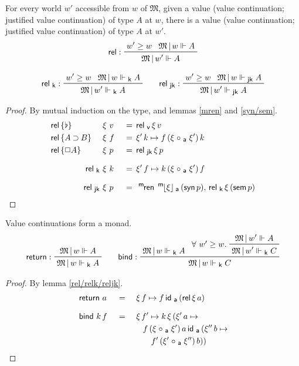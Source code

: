 \documentclass{entcs}
\numberwithin{equation}{thm}
\newcommand{\tsf}[1]{\textsf{\upshape{#1}}}
\newcommand{\stsf}[1]{\smash{\tsf{\small{#1}}}}
\renewcommand{\:}{\mathrel{:}}
\newcommand{\tyrule}[1]{\prftree[l]{${#1} \:\,$}}
\let\oldforall\forall
\renewcommand{\forall}{\oldforall\,}
\newcommand{\0}{\varnothing}
\newcommand{\base}{\flat}
\newcommand{\imp}{\mathbin{\supset}}
\newcommand{\sq}{\Box}
\newcommand{\mren}{\operatorname{^{\stsf{m}\mkern-2mu}\tsf{ren}}}
\newcommand{\M}{\mathfrak{M}}
\newcommand{\Mover}{\M\,|\,}
\newcommand{\ida}{\operatorname{\tsf{id}_{\stsf{a}}}}
\newcommand{\compa}{\mathrel{\circ_{\stsf{a}}}}
\newcommand{\relv}{\operatorname{\tsf{rel}_{\stsf{v}}}}
\newcommand{\mpeeka}[1]{\mathopen{^{\stsf{m}\mkern-3mu}\lfloor}{#1}\mathclose{\rfloor_{\mkern-2mu\stsf{a}}}}
\newcommand{\ee}{\mathrel{\Vdash}}
\newcommand{\eek}{\mathrel{\Vdash_{\stsf{k}}}}
\newcommand{\eejk}{\mathrel{\Vdash_{\stsf{jk}}}}
\newcommand{\syn}{\operatorname{\tsf{syn}}}
\newcommand{\sem}{\operatorname{\tsf{sem}}}
\newcommand{\rel}{\operatorname{\tsf{rel}}}
\newcommand{\relk}{\operatorname{\tsf{rel}_{\stsf{k}}}}
\newcommand{\reljk}{\operatorname{\tsf{rel}_{\stsf{jk}}}}
\newcommand{\return}{\operatorname{\tsf{return}}}
\newcommand{\bind}{\operatorname{\tsf{bind}}}
\begin{document}
\begin{lemma}
  \normalshape
  \label{rel/relk/reljk}
  For every world $w'$ accessible from $w$ of $\M$, given a value (value continuation; justified value continuation) of type $A$ at $w$, there is a value (value continuation; justified value continuation) of type $A$ at $w'$.
  \begin{gather*}
    \tyrule{\rel}{w' \ge w}{\Mover w \ee A}{\Mover w' \ee A}\\[0.5\baselineskip]
    \tyrule{\relk}{w' \ge w}{\Mover w \eek A}{\Mover w' \eek A}\qquad
    \tyrule{\reljk}{w' \ge w}{\Mover w \eejk A}{\Mover w' \eejk A}
  \end{gather*}
  \itshape
  \begin{proof}
    \normalshape
    By mutual induction on the type, and lemmas \ref{mren} and \ref{syn/sem}.
    \begin{alignat*}{3}
      & \rlap{$\rel\, \{\base\}$}     &\,\xi\, &\,v \,&&=\, \relv \xi\, v\\
      & \rlap{$\rel\, \{A \imp B\}$}  &\,\xi\, &\,f \,&&=\, \xi'\, k \mapsto f\, (\xi \compa \xi')\, k\\
      & \rlap{$\rel\, \{\sq A\}$}     &\,\xi\, &\,p \,&&=\, \reljk \xi\, p\\[0.5\baselineskip]
      && \qquad\quad \relk             \,\xi\, &\,k \,&&=\, \xi'\, f \mapsto k\, (\xi \compa \xi')\, f\\[0.5\baselineskip]
      && \qquad\quad \reljk            \,\xi\, &\,p \,&&=\, \mren\, \mpeeka{\xi}\, (\syn p),\, \relk \xi\, (\sem p)
    \end{alignat*}
  \end{proof}
\end{lemma}

\begin{lemma}
  \normalshape
  \label{return/bind}
  Value continuations form a monad.
  \begin{gather*}
    \tyrule{\return}{\Mover w \ee A}{\Mover w \eek A}\qquad
    \tyrule{\bind}{\Mover w \eek A}{\raisebox{8pt}{$\forall w' \ge w.\ $} \prftree{\Mover w' \ee A}{\Mover w' \eek C}}{\Mover w \eek C}
  \end{gather*}
  \itshape
  \begin{proof}
    \normalshape
    By lemma \ref{rel/relk/reljk}.
    \begin{alignat*}{3}
      & \return\,a    \,&&=\, &&\,\xi\, f \mapsto f \ida\, (\rel \xi\, a)\\[0.5\baselineskip]
      & \bind\, k\, f \,&&=\, &&\,\xi\, f' \mapsto k\, \xi\, (\xi'\, a \mapsto\\
      &                 &&    &&\quad f\, (\xi \compa \xi')\, a \ida\, (\xi''\, b \mapsto\\
      &                 &&    &&\quad\quad f'\, (\xi' \compa \xi'')\, b))
    \end{alignat*}
  \end{proof}
\end{lemma}
\end{document}
